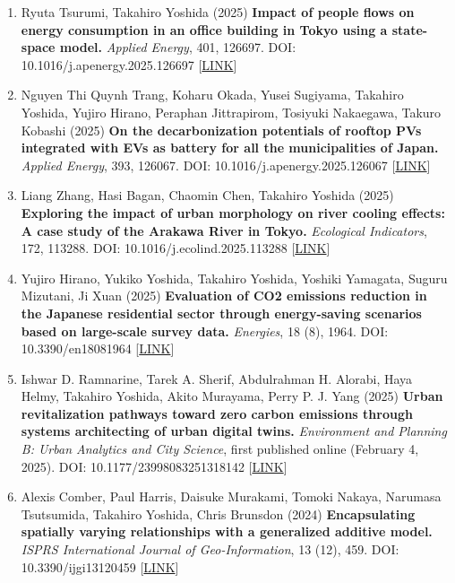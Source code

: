 \documentclass[
]{book}
\providecommand{\tightlist}{%
  \setlength{\itemsep}{0pt}\setlength{\parskip}{0pt}}
\begin{document}
\begin{enumerate}
\def\labelenumi{\arabic{enumi}.}
\tightlist
\item
  Ryuta Tsurumi, Takahiro Yoshida (2025)
  \textbf{Impact of people flows on energy consumption in an office building in Tokyo using a state-space model.}
  \emph{Applied Energy}, 401, 126697.
  DOI: 10.1016/j.apenergy.2025.126697 {[}\href{https://doi.org/10.1016/j.apenergy.2025.126697}{LINK}{]}
\item
  Nguyen Thi Quynh Trang, Koharu Okada, Yusei Sugiyama, Takahiro Yoshida, Yujiro Hirano, Peraphan Jittrapirom, Tosiyuki Nakaegawa, Takuro Kobashi (2025)
  \textbf{On the decarbonization potentials of rooftop PVs integrated with EVs as battery for all the municipalities of Japan.}
  \emph{Applied Energy}, 393, 126067.
  DOI: 10.1016/j.apenergy.2025.126067 {[}\href{https://www.sciencedirect.com/science/article/pii/S0306261925007974}{LINK}{]}
\item
  Liang Zhang, Hasi Bagan, Chaomin Chen, Takahiro Yoshida (2025)
  \textbf{Exploring the impact of urban morphology on river cooling effects: A case study of the Arakawa River in Tokyo.}
  \emph{Ecological Indicators}, 172, 113288.
  DOI: 10.1016/j.ecolind.2025.113288 {[}\href{https://doi.org/10.1016/j.ecolind.2025.113288}{LINK}{]}
\item
  Yujiro Hirano, Yukiko Yoshida, Takahiro Yoshida, Yoshiki Yamagata, Suguru Mizutani, Ji Xuan (2025)
  \textbf{Evaluation of CO2 emissions reduction in the Japanese residential sector through energy-saving scenarios based on large-scale survey data.}
  \emph{Energies}, 18 (8), 1964.
  DOI: 10.3390/en18081964 {[}\href{https://doi.org/10.3390/en18081964}{LINK}{]}
\item
  Ishwar D. Ramnarine, Tarek A. Sherif, Abdulrahman H. Alorabi, Haya Helmy, Takahiro Yoshida, Akito Murayama, Perry P. J. Yang (2025)
  \textbf{Urban revitalization pathways toward zero carbon emissions through systems architecting of urban digital twins.}
  \emph{Environment and Planning B: Urban Analytics and City Science}, first published online (February 4, 2025).
  DOI: 10.1177/23998083251318142 {[}\href{https://doi.org/10.1177/23998083251318142}{LINK}{]}
\item
  Alexis Comber, Paul Harris, Daisuke Murakami, Tomoki Nakaya, Narumasa Tsutsumida, Takahiro Yoshida, Chris Brunsdon (2024)
  \textbf{Encapsulating spatially varying relationships with a generalized additive model.}
  \emph{ISPRS International Journal of Geo-Information}, 13 (12), 459.
  DOI: 10.3390/ijgi13120459 {[}\href{https://doi.org/10.3390/ijgi13120459}{LINK}{]}

\end{enumerate}
\end{document}
